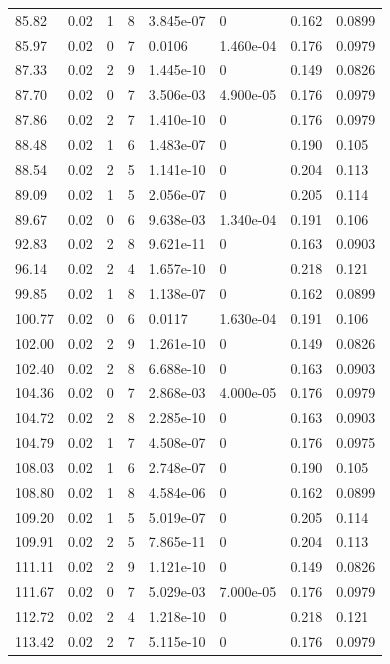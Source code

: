 \documentclass[preview]{standalone}
\begin{document}
{{{\begin{tabular}{L{1.2cm}C{1.2cm} C{0.3cm}C{0.5cm} C{1.4cm}C{1.4cm} C{1.4cm}C{1.4cm}}
  85.82  &  0.02  & 1     &  8 &  3.845e-07  & 0  & 0.162 &  0.0899   \\ 
  85.97  &  0.02  & 0     &  7 &  0.0106  & 1.460e-04  & 0.176 &  0.0979   \\ 
  87.33  &  0.02  & 2     &  9 &  1.445e-10  & 0  & 0.149 &  0.0826   \\ 
  87.70  &  0.02  & 0     &  7 &  3.506e-03  & 4.900e-05  & 0.176 &  0.0979   \\ 
  87.86  &  0.02  & 2     &  7 &  1.410e-10  & 0  & 0.176 &  0.0979   \\ 
  88.48  &  0.02  & 1     &  6 &  1.483e-07  & 0  & 0.190 &  0.105   \\ 
  88.54  &  0.02  & 2     &  5 &  1.141e-10  & 0  & 0.204 &  0.113   \\ 
  89.09  &  0.02  & 1     &  5 &  2.056e-07  & 0  & 0.205 &  0.114   \\ 
  89.67  &  0.02  & 0     &  6 &  9.638e-03  & 1.340e-04  & 0.191 &  0.106   \\ 
  92.83  &  0.02  & 2     &  8 &  9.621e-11  & 0  & 0.163 &  0.0903   \\ 
  96.14  &  0.02  & 2     &  4 &  1.657e-10  & 0  & 0.218 &  0.121   \\ 
  99.85  &  0.02  & 1     &  8 &  1.138e-07  & 0  & 0.162 &  0.0899   \\ 
  100.77  &  0.02  & 0     &  6 &  0.0117  & 1.630e-04  & 0.191 &  0.106   \\ 
  102.00  &  0.02  & 2     &  9 &  1.261e-10  & 0  & 0.149 &  0.0826   \\ 
  102.40  &  0.02  & 2     &  8 &  6.688e-10  & 0  & 0.163 &  0.0903   \\ 
  104.36  &  0.02  & 0     &  7 &  2.868e-03  & 4.000e-05  & 0.176 &  0.0979   \\ 
  104.72  &  0.02  & 2     &  8 &  2.285e-10  & 0  & 0.163 &  0.0903   \\ 
  104.79  &  0.02  & 1     &  7 &  4.508e-07  & 0  & 0.176 &  0.0975   \\ 
  108.03  &  0.02  & 1     &  6 &  2.748e-07  & 0  & 0.190 &  0.105   \\ 
  108.80  &  0.02  & 1     &  8 &  4.584e-06  & 0  & 0.162 &  0.0899   \\ 
  109.20  &  0.02  & 1     &  5 &  5.019e-07  & 0  & 0.205 &  0.114   \\ 
  109.91  &  0.02  & 2     &  5 &  7.865e-11  & 0  & 0.204 &  0.113   \\ 
  111.11  &  0.02  & 2     &  9 &  1.121e-10  & 0  & 0.149 &  0.0826   \\ 
  111.67  &  0.02  & 0     &  7 &  5.029e-03  & 7.000e-05  & 0.176 &  0.0979   \\ 
  112.72  &  0.02  & 2     &  4 &  1.218e-10  & 0  & 0.218 &  0.121   \\ 
  113.42  &  0.02  & 2     &  7 &  5.115e-10  & 0  & 0.176 &  0.0979   \\ 
\hline 
\end{tabular} 

}}}
\end{document}
